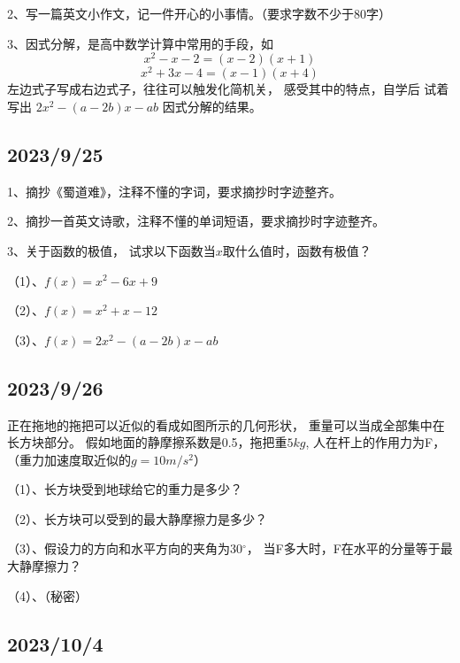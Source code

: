 \documentclass[cn,12pt]{elegantbook}
\begin{document}
      2、写一篇英文小作文，记一件开心的小事情。（要求字数不少于80字）
      
      3、因式分解，是高中数学计算中常用的手段，如
        \[x^2-x-2 =(x-2)(x+1)\]
        \[ x^2+3x-4 = (x-1)(x+4) \]
        左边式子写成右边式子，往往可以触发化简机关，
        感受其中的特点，自学后
        试着写出 $ 2x^2 -(a-2b)x -ab$ 因式分解的结果。

    
     \subsection*{2023/9/25}
        1、摘抄《蜀道难》，注释不懂的字词，要求摘抄时字迹整齐。

        2、摘抄一首英文诗歌，注释不懂的单词短语，要求摘抄时字迹整齐。

        3、关于函数的极值，
        试求以下函数当$x$取什么值时，函数有极值？

        （1）、$ f(x) = x^2 - 6x + 9$
         
        （2）、$ f(x) = x^2 + x -12 $ %
       
        （3）、$ f(x) = 2x^2 -(a-2b)x -ab $

        
        \subsection*{2023/9/26}
            

          正在拖地的拖把可以近似的看成如图所示的几何形状，
          重量可以当成全部集中在长方块部分。
          假如地面的静摩擦系数是0.5，拖把重$5kg$,
          人在杆上的作用力为F，
          （重力加速度取近似的$g=10m/s^2$）

          （1）、长方块受到地球给它的重力是多少？

          （2）、长方块可以受到的最大静摩擦力是多少？

          （3）、假设力的方向和水平方向的夹角为$30{^\circ}$，
          当F多大时，F在水平的分量等于最大静摩擦力？

          （4）、（秘密）

\subsection*{2023/10/4}
\end{document}
